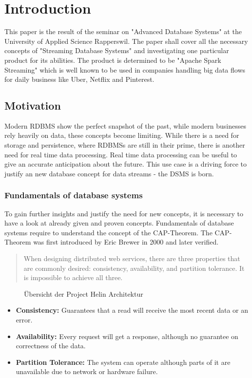 \chapter{Introduction}

This paper is the result of the seminar on "Advanced Database Systems" at the University of Applied Science Rapperswil. The paper shall cover all the necessary concepts of "Streaming Database Systems" and investigating one particular product for its abilities. The product is determined to be "Apache Spark Streaming" which is well known to be used in companies handling big data flows for daily business like Uber\cite{uber}, Netflix and Pinterest.

\section{Motivation}
Modern \Gls{RDBMS} show the perfect snapshot of the past, while modern businesses rely heavily on data, these concepts become limiting. While there is a need for storage and persistence, where \Gls{RDBMS}s are still in their prime, there is another need for real time data processing. Real time data processing can be useful to give an accurate anticipation about the future. This use case is a driving force to justify an new database concept for data streams - the \Gls{DSMS} is born. 
\\
\subsection{Fundamentals of database systems}
To gain further insights and justify the need for new concepts, it is necessary to have a look at already given and proven concepts. Fundamentals of database systems require to understand the concept of the CAP-Theorem. The CAP-Theorem was first introduced by Eric Brewer in 2000 and later verified.
\\
\blockquote{When designing distributed web services, there are three properties that are commonly desired: consistency, availability, and partition tolerance. It is impossible to achieve all three.} \cite[S. 1]{Gilbert:2002:BCF:564585.564601}

\begin{figure}[H]
	\centering
	\caption{Übersicht der Project Helin Architektur }
	\label{fig:architecture-overview}
\end{figure}


\begin{itemize}
	\item{\textbf{Consistency:} Guarantees that a read will receive the most recent data or an error.}
	\item{\textbf{Availability:} Every request will get a response, although no guarantee on correctness of the data. }
	\item{\textbf{Partition Tolerance:} The system can operate although parts of it are unavailable due to network or hardware failure.}
	
\end{itemize}

